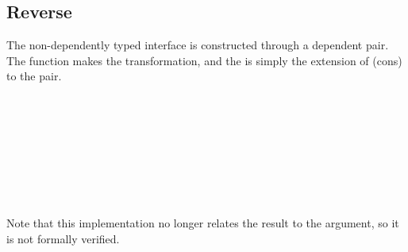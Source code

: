 \documentclass[12pt,twoside,notitlepage]{report}
\begin{document}
\subsection{Reverse}

The non-dependently typed interface is constructed through a dependent pair. The function  makes the transformation, and the  is simply the extension of (cons) to the pair.\\

\begin{code}
\> \AgdaSymbol{:}  \AgdaSymbol{\{}\AgdaSymbol{\}} \AgdaSymbol{\{} \AgdaSymbol{:}  \AgdaSymbol{\}} \AgdaSymbol{\{} \AgdaSymbol{:}  \AgdaSymbol{\}}\<%
\\
\>[2]\<[10]%
\>[10]  \AgdaSymbol{:}   \<%
\\
\>[2]\<[10]%
\>[10]  \AgdaSymbol{:}    \<%
\\
\>[2]\<[10]%
\>[10] \AgdaSymbol{(}        \AgdaSymbol{\{}\AgdaSymbol{\}))}\<%
\\
\>[2]\<[10]%
\>[10] \AgdaSymbol{(}        \AgdaSymbol{\{}\AgdaSymbol{\}))}\<%
\\
\> \AgdaSymbol{\{}\AgdaSymbol{\}} \AgdaSymbol{\{}\AgdaSymbol{\}} \AgdaSymbol{\{}\AgdaSymbol{\}}  \AgdaSymbol{=}\<%
\\
\>[0]\<[2]%
\>[2]  \AgdaSymbol{(} \AgdaSymbol{\{} \AgdaSymbol{=} \AgdaSymbol{\}} \AgdaSymbol{\{} \AgdaSymbol{=} \AgdaSymbol{\}} \AgdaSymbol{)} \<%
\\
%
\end{code} 

Note that this implementation no longer relates the result to the argument, so it is not formally verified. 
\end{document}
